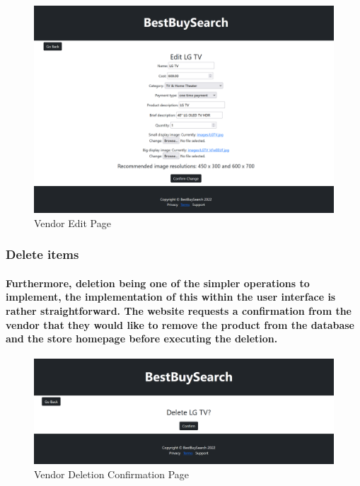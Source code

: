 \documentclass[sigconf]{acmart}
\begin{document}
\begin{figure}[H]
    \centering
    \includegraphics[scale=0.2]{VendorEdit.PNG}
    \caption{Vendor Edit Page}
    \label{fig:my_label}
\end{figure}

\subsubsection{Delete items}

\paragraph{Furthermore, deletion being one of the simpler operations to implement, the implementation of this within the user interface is rather straightforward. The website requests a confirmation from the vendor that they would like to remove the product from the database and the store homepage before executing the deletion.}

\begin{figure}[H]
    \centering
    \includegraphics[scale=0.2]{VendorDelete.PNG}
    \caption{Vendor Deletion Confirmation Page}
    \label{fig:my_label}
\end{figure}
\end{document}
